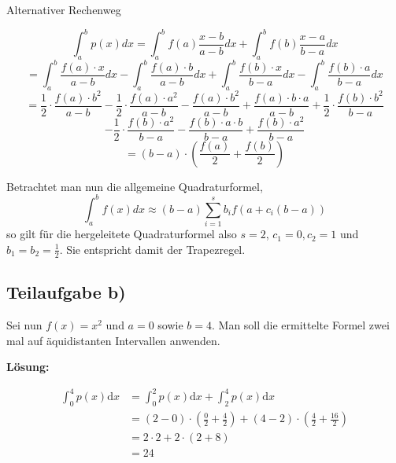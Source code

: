 Alternativer Rechenweg

\[ \int_a^b p(x)dx = \int_a^b f(a) \frac{x-b}{a-b}dx + \int_a^b f(b) \frac{x-a}{b-a}dx \]
\[ = \int_a^b \frac{f(a) \cdot x}{a-b}dx - \int_a^b \frac{f(a) \cdot b}{a-b}dx + \int_a^b \frac{f(b) \cdot x}{b-a}dx - \int_a^b \frac{f(b) \cdot a}{b-a}dx \]
\[ = \frac{1}{2} \cdot \frac{f(a) \cdot b^2}{a-b} - \frac{1}{2} \cdot \frac{f(a) \cdot a^2}{a-b} - \frac{f(a) \cdot b^2}{a-b} + \frac{f(a) \cdot b \cdot a}{a-b} + \frac{1}{2} \cdot \frac{f(b) \cdot b^2}{b-a} \]
\[ - \frac{1}{2} \cdot \frac{f(b) \cdot a^2}{b-a} - \frac{f(b) \cdot a \cdot b}{b-a} + \frac{f(b) \cdot a^2}{b-a}\]
\[=(b-a)\cdot(\frac{f(a)}{2} + \frac{f(b)}{2})\]

Betrachtet man nun die allgemeine Quadraturformel,
\[
\int_a^b f(x)dx \approx (b-a) \sum_{i=1}^s b_i f(a+c_i(b-a))
\]
so gilt für die hergeleitete Quadraturformel also $s=2$, $c_1=0, c_2=1$ und $b_1 = b_2 = \frac{1}{2}$. Sie entspricht damit der Trapezregel.

\subsection*{Teilaufgabe b)}
Sei nun $f(x) = x^2$ und $a = 0$ sowie $b = 4$. Man soll die ermittelte
Formel zwei mal auf äquidistanten Intervallen anwenden.

\textbf{Lösung:}

\begin{align}
	\int_0^4 p(x) \mathrm{d}x &= \int_0^2 p(x)\mathrm{d}x + \int_2^4 p(x)\mathrm{d}x \\
    &= (2-0)\cdot \left (\frac{0}{2} + \frac{4}{2} \right ) + (4-2) \cdot \left (\frac{4}{2} + \frac{16}{2} \right )\\
    &= 2 \cdot 2 + 2 \cdot (2+8)\\
    &= 24
\end{align}

